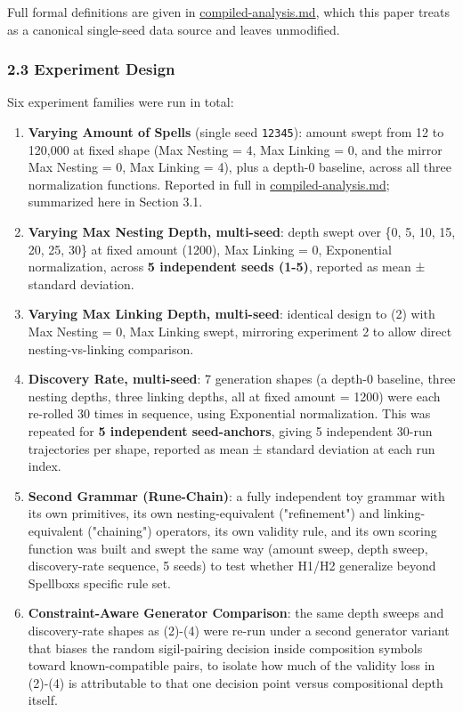 \documentclass[
  10pt,
  twocolumn]{article}
\providecommand{\tightlist}{%
  \setlength{\itemsep}{0pt}\setlength{\parskip}{0pt}}
\begin{document}
Full formal definitions are given in \url{compiled-analysis.md}, which
this paper treats as a canonical single-seed data source and leaves
unmodified.

\subsubsection{2.3 Experiment Design}\label{23-experiment-design}

Six experiment families were run in total:

\begin{enumerate}
\def\labelenumi{\arabic{enumi}.}
\tightlist
\item
  \textbf{Varying Amount of Spells} (single seed \texttt{12345}): amount
  swept from 12 to 120,000 at fixed shape (Max Nesting = 4, Max Linking
  = 0, and the mirror Max Nesting = 0, Max Linking = 4), plus a depth-0
  baseline, across all three normalization functions. Reported in full
  in \url{compiled-analysis.md}; summarized here in Section 3.1.
\item
  \textbf{Varying Max Nesting Depth, multi-seed}: depth swept over \{0,
  5, 10, 15, 20, 25, 30\} at fixed amount (1200), Max Linking = 0,
  Exponential normalization, across \textbf{5 independent seeds (1-5)},
  reported as mean ± standard deviation.
\item
  \textbf{Varying Max Linking Depth, multi-seed}: identical design to
  (2) with Max Nesting = 0, Max Linking swept, mirroring experiment 2 to
  allow direct nesting-vs-linking comparison.
\item
  \textbf{Discovery Rate, multi-seed}: 7 generation shapes (a depth-0
  baseline, three nesting depths, three linking depths, all at fixed
  amount = 1200) were each re-rolled 30 times in sequence, using
  Exponential normalization. This was repeated for \textbf{5 independent
  seed-anchors}, giving 5 independent 30-run trajectories per shape,
  reported as mean ± standard deviation at each run index.
\item
  \textbf{Second Grammar (Rune-Chain)}: a fully independent toy grammar
  with its own primitives, its own nesting-equivalent ("refinement") and
  linking-equivalent ("chaining") operators, its own validity rule, and
  its own scoring function was built and swept the same way (amount
  sweep, depth sweep, discovery-rate sequence, 5 seeds) to test whether
  H1/H2 generalize beyond Spellbox\textquotesingle s specific rule set.
\item
  \textbf{Constraint-Aware Generator Comparison}: the same depth sweeps
  and discovery-rate shapes as (2)-(4) were re-run under a second
  generator variant that biases the random sigil-pairing decision inside
  composition symbols toward known-compatible pairs, to isolate how much
  of the validity loss in (2)-(4) is attributable to that one decision
  point versus compositional depth itself.
\end{enumerate}
\end{document}
